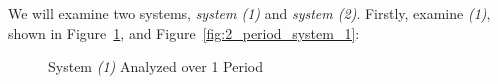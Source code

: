 We will examine two systems, \emph{system (1)} and \emph{system (2)}.
Firstly, examine \emph{(1)}, shown in
Figure~\ref{fig:1_period_system_1}, and
Figure~\ref{fig:2_period_system_1}:

\begin{figure}[ht!]
  \centering
  \caption{System \emph{(1)} Analyzed over 1 Period}
  \label{fig:1_period_system_1}
\end{figure}


